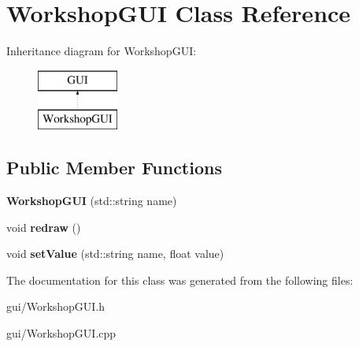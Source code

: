 \hypertarget{classWorkshopGUI}{}\section{Workshop\+G\+UI Class Reference}
\label{classWorkshopGUI}
Inheritance diagram for Workshop\+G\+UI\+:\begin{figure}[H]
\begin{center}
\leavevmode
\includegraphics[height=2.000000cm]{classWorkshopGUI}
\end{center}
\end{figure}
\subsection*{Public Member Functions}
\begin{DoxyCompactItemize}
\item 
{\bfseries Workshop\+G\+UI} (std\+::string name)\hypertarget{classWorkshopGUI_af4b636b395eafa6ac762a6ad241a922f}{}\label{classWorkshopGUI_af4b636b395eafa6ac762a6ad241a922f}

\item 
void {\bfseries redraw} ()\hypertarget{classWorkshopGUI_abaa68b1731ba8e97fcb73d10b948930b}{}\label{classWorkshopGUI_abaa68b1731ba8e97fcb73d10b948930b}

\item 
void {\bfseries set\+Value} (std\+::string name, float value)\hypertarget{classWorkshopGUI_a8bd7d110ea4396da32970c59ec4c86e7}{}\label{classWorkshopGUI_a8bd7d110ea4396da32970c59ec4c86e7}

\end{DoxyCompactItemize}


The documentation for this class was generated from the following files\+:\begin{DoxyCompactItemize}
\item 
gui/Workshop\+G\+U\+I.\+h\item 
gui/Workshop\+G\+U\+I.\+cpp\end{DoxyCompactItemize}
